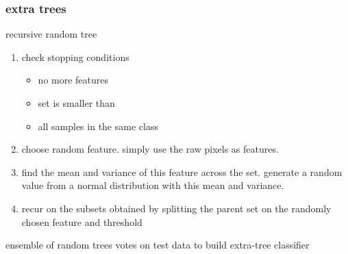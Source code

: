 \begin{frame}
  \frametitle{extra trees}

  recursive random tree
  \begin{enumerate}
  \item check stopping conditions
    \begin{itemize}
    \item no more features
    \item set is smaller than 
    \item all samples in the same class
    \end{itemize}
  \item choose random feature. simply use the raw pixels as features. 
  \item find the mean and variance of this feature across the set. generate a random value from a normal distribution with this mean and variance. 
  \item recur on the subsets obtained by splitting the parent set on the randomly chosen feature and threshold
  \end{enumerate}

  ensemble of random trees votes on test data to build extra-tree classifier

\end{frame}